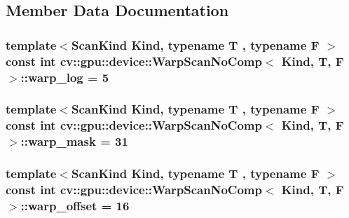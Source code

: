 \subsection{Member Data Documentation}
\hypertarget{structcv_1_1gpu_1_1device_1_1WarpScanNoComp_a4084327bde405e8f12f67b3df4f333df}{
\subsubsection[{warp\-\_\-log}]{\setlength{\rightskip}{0pt plus 5cm}template$<$Scan\-Kind Kind, typename T , typename F $>$ const int {\bf cv\-::gpu\-::device\-::\-Warp\-Scan\-No\-Comp}$<$ Kind, {\bf T}, {\bf F} $>$\-::warp\-\_\-log = 5\hspace{0.3cm}{\ttfamily [static]}}}\label{structcv_1_1gpu_1_1device_1_1WarpScanNoComp_a4084327bde405e8f12f67b3df4f333df}
\hypertarget{structcv_1_1gpu_1_1device_1_1WarpScanNoComp_a06a64367fc51636ce16d976cc62d7575}{
\subsubsection[{warp\-\_\-mask}]{\setlength{\rightskip}{0pt plus 5cm}template$<$Scan\-Kind Kind, typename T , typename F $>$ const int {\bf cv\-::gpu\-::device\-::\-Warp\-Scan\-No\-Comp}$<$ Kind, {\bf T}, {\bf F} $>$\-::warp\-\_\-mask = 31\hspace{0.3cm}{\ttfamily [static]}}}\label{structcv_1_1gpu_1_1device_1_1WarpScanNoComp_a06a64367fc51636ce16d976cc62d7575}
\hypertarget{structcv_1_1gpu_1_1device_1_1WarpScanNoComp_acc5d0070713a56992f79870a26088853}{
\subsubsection[{warp\-\_\-offset}]{\setlength{\rightskip}{0pt plus 5cm}template$<$Scan\-Kind Kind, typename T , typename F $>$ const int {\bf cv\-::gpu\-::device\-::\-Warp\-Scan\-No\-Comp}$<$ Kind, {\bf T}, {\bf F} $>$\-::warp\-\_\-offset = 16\hspace{0.3cm}{\ttfamily [static]}}}\label{structcv_1_1gpu_1_1device_1_1WarpScanNoComp_acc5d0070713a56992f79870a26088853}
